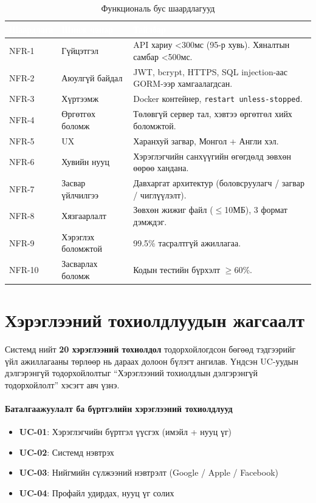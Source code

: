 \begin{table}[ht]
\centering
\footnotesize
\renewcommand{\arraystretch}{1.3}
\begin{tabular}{|p{2cm}|p{3.4cm}|p{7cm}|}
\hline
\rowcolor{darknavy}
\textcolor{white}{\textbf{Шаардлага}} & \textcolor{white}{\textbf{Шинж чанар}} & \textcolor{white}{\textbf{Тайлбар}} \\ \hline
NFR-1 & Гүйцэтгэл              & API хариу <300мс (95-р хувь). Хяналтын самбар <500мс. \\ \hline
NFR-2 & Аюулгүй байдал         & JWT, bcrypt, HTTPS, SQL injection-аас GORM-ээр хамгаалагдсан. \\ \hline
NFR-3 & Хүртээмж               & Docker контейнер, \texttt{restart unless-stopped}. \\ \hline
NFR-4 & Өргөтгөх боломж        & Төлөвгүй сервер тал, хэвтээ өргөтгөл хийх боломжтой. \\ \hline
NFR-5 & UX                     & Харанхуй загвар, Монгол + Англи хэл. \\ \hline
NFR-6 & Хувийн нууц            & Хэрэглэгчийн санхүүгийн өгөгдөлд зөвхөн өөрөө хандана. \\ \hline
NFR-7 & Засвар үйлчилгээ       & Давхаргат архитектур (боловсруулагч / загвар / чиглүүлэлт). \\ \hline
NFR-8 & Хязгаарлалт            & Зөвхөн жижиг файл ($\leq$10МБ), 3 формат дэмждэг. \\ \hline
NFR-9 & Хэрэглэх боломжтой     & 99.5\% тасралтгүй ажиллагаа. \\ \hline
NFR-10 & Засварлах боломж      & Кодын тестийн бүрхэлт $\geq$60\%. \\ \hline
\end{tabular}
\caption{Функциональ бус шаардлагууд}
\label{tab:nfr}
\end{table}

\section{Хэрэглээний тохиолдлуудын жагсаалт}
Системд нийт \textbf{20 хэрэглээний тохиолдол} тодорхойлогдсон бөгөөд тэдгээрийг үйл ажиллагааны төрлөөр нь дараах долоон бүлэгт ангилав. Үндсэн UC-уудын дэлгэрэнгүй тодорхойлолтыг ``Хэрэглээний тохиолдлын дэлгэрэнгүй тодорхойлолт'' хэсэгт авч үзнэ.

\paragraph{Баталгаажуулалт ба бүртгэлийн хэрэглээний тохиолдлууд}
\begin{itemize}
    \item \textbf{UC-01}: Хэрэглэгчийн бүртгэл үүсгэх (имэйл + нууц үг)
    \item \textbf{UC-02}: Системд нэвтрэх
    \item \textbf{UC-03}: Нийгмийн сүлжээний нэвтрэлт (Google / Apple / Facebook)
    \item \textbf{UC-04}: Профайл удирдах, нууц үг солих
\end{itemize}

